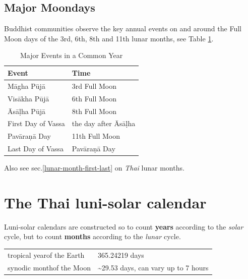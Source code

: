 \documentclass[11pt,oneside]{memoir-article}
\begin{document}
\clearpage

\section{Major Moondays}
\label{sec-2-3}
\label{major-moondays}

Buddhist communities observe the key annual events on and around the Full Moon
days of the 3rd, 6th, 8th and 11th lunar months, see Table \ref{tbl-major-events}.

\begin{table}[h]
\caption{\label{tbl-major-events} Major Events in a Common Year}
\centering
\begin{tabular}{ll}
Event & Time\\
\hline
Māgha Pūjā & 3rd Full Moon\\
Visākha Pūjā & 6th Full Moon\\
Āsāḷha Pūjā & 8th Full Moon\\
First Day of Vassa & the day after Āsāḷha\\
Pavāraṇā Day & 11th Full Moon\\
Last Day of Vassa & Pavāraṇā Day\\
\end{tabular}
\end{table}

Also see sec.\ref{lunar-month-first-last} on \emph{Thai} lunar months.

\clearpage

\chapter{The Thai luni-solar calendar}
\label{sec-3}

Luni-solar calendars are constructed so to count \textbf{years} according to
the \emph{solar} cycle, but to count \textbf{months} according to the \emph{lunar} cycle.

\begin{center}
\begin{tabular}{ll}
tropical year\footnotemark\space of the Earth & 365.24219 days\\
synodic month\footnotemark\space of the Moon & \textasciitilde{}29.53 days, can vary up to 7 hours\\
\end{tabular}
\end{center}
\end{document}
